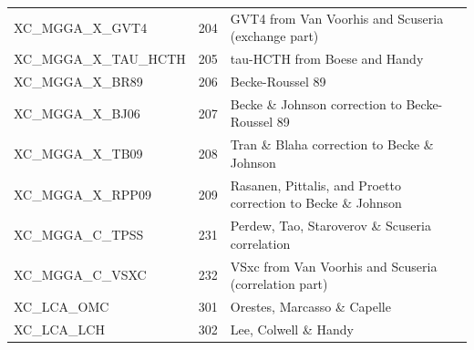 \documentclass[a4paper,11pt]{report}
\begin{document}
\begin{longtable}{lrl}
   XC\_MGGA\_X\_GVT4          & 204  &  GVT4 from Van Voorhis and Scuseria (exchange part)    \\
   XC\_MGGA\_X\_TAU\_HCTH     & 205  &  tau-HCTH from Boese and Handy \\
   XC\_MGGA\_X\_BR89          & 206  &  Becke-Roussel 89  \\
   XC\_MGGA\_X\_BJ06          & 207  &  Becke \& Johnson correction to Becke-Roussel 89  \\
   XC\_MGGA\_X\_TB09          & 208  &  Tran \& Blaha correction to Becke \& Johnson  \\
   XC\_MGGA\_X\_RPP09         & 209  &  Rasanen, Pittalis, and Proetto correction to Becke \& Johnson\\
   XC\_MGGA\_C\_TPSS          & 231  &  Perdew, Tao, Staroverov \& Scuseria correlation\\
   XC\_MGGA\_C\_VSXC          & 232  &  VSxc from Van Voorhis and Scuseria (correlation part)\\
   XC\_LCA\_OMC               & 301  &  Orestes, Marcasso \& Capelle  \\
   XC\_LCA\_LCH               & 302  &  Lee, Colwell \& Handy\\
\end{longtable}
\end{document}
